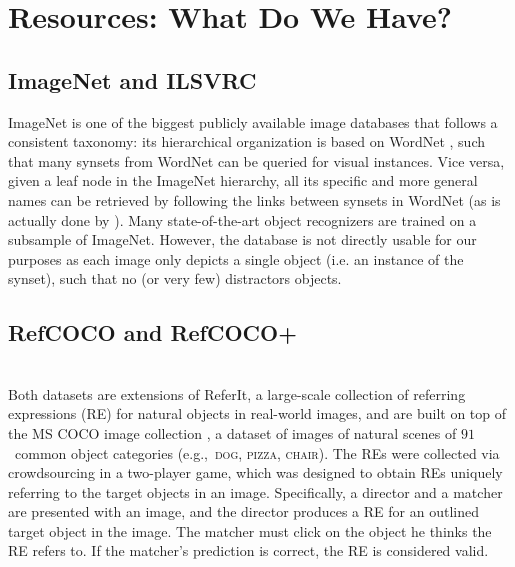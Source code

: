 \documentclass[runningheads]{llncs}
\newcommand{\referit}{ReferIt\xspace}
\newcommand{\refcoco}{RefCOCO\xspace}
\newcommand{\refcocop}{RefCOCO+\xspace}
\newcommand{\cat}[1]{\textsc{#1}}
\begin{document}
\section{Resources: What Do We Have?}
\label{sec:resources}

\subsection{ImageNet and ILSVRC}

ImageNet \cite{imagenet_cvpr09} is one of the biggest publicly available image databases that follows a consistent taxonomy: its hierarchical organization is based on WordNet \cite{fellbaum1998wordnet}, such that many synsets from WordNet can be queried for visual instances.
Vice versa, given a leaf node in the ImageNet hierarchy, all its specific and more general names can be retrieved by following the links between synsets in WordNet (as is actually done by \cite{Ordonez:2016}).
Many state-of-the-art object recognizers are trained on a subsample of ImageNet.
However, the database is not directly usable for our purposes as each image only depicts a single object (i.e. an instance of the synset), such that no (or very few) distractors objects. 


\subsection{\refcoco and \refcocop \cite{Yu2016}}~\\ 
Both datasets are extensions of \referit\cite{Kazemzadeh2014}, a large-scale collection of referring expressions (RE) for natural objects in real-world images, and are built on top of the MS COCO image collection \cite{mscoco}, 
a dataset of images of natural scenes of $91$~common object categories (e.g.,~\cat{dog, pizza, chair}). 
The REs were collected via crowdsourcing in a two-player game, which was designed to obtain REs uniquely referring to the target objects in an image. 
Specifically, a director and a matcher are presented with an image, and the director produces a RE for an outlined target object in the image. 
The matcher must click on the object he thinks the RE refers to. %
If the matcher's prediction is correct, the RE is considered valid.
\end{document}
